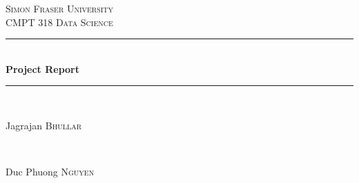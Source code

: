 \begin{titlepage}

\newcommand{\HRule}{\rule{\linewidth}{0.5mm}} %

\center %
 

\textsc{\LARGE Simon Fraser University}\\[1.5cm] %
\textsc{\Large CMPT 318 Data Science}\\[0.5cm] %


\HRule \\[0.4cm]
{ \huge \bfseries Project Report}\\[0.4cm] %
\HRule \\[1.5cm]
 

\begin{minipage}{0.4\textwidth}
\begin{flushleft} \large
Jagrajan \textsc{Bhullar}
\end{flushleft}
\end{minipage}
~
\begin{minipage}{0.4\textwidth}
\begin{flushright} \large
Duc Phuong \textsc{Nguyen}
\end{flushright}
\end{minipage}\\[2cm]



\end{titlepage}
